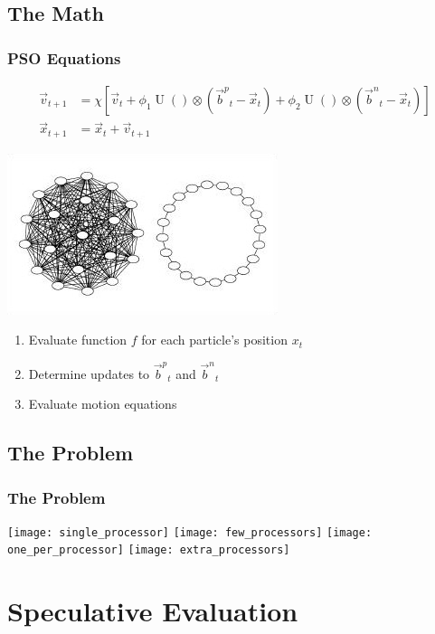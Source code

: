 \documentclass{beamer}
\DeclareMathOperator{\URand}{U}
\providecommand{\ppos}{\ensuremath{\Vec{x}}}
\providecommand{\pvel}{\ensuremath{\Vec{v}}}
\providecommand{\nbest}{\ensuremath{\Vec{b}^n}}
\providecommand{\pbest}{\ensuremath{\Vec{b}^p}}
\providecommand{\constriction}{\ensuremath{\chi}}
\providecommand{\coeff}{\ensuremath{\phi}}
\begin{document}
\subsection{The Math}
\begin{frame}
  \frametitle{PSO Equations}
  \begin{align*}
	  \pvel_{t+1} &=
		  \constriction \left[ \pvel_t +
			  \coeff_1\URand()\otimes(\pbest_t - \ppos_t) +
			  \coeff_2\URand()\otimes(\nbest_t - \ppos_t)
		  \right] \\
	  \ppos_{t+1} &= \ppos_t + \pvel_{t+1}
  \end{align*}

  \begin{center}
	\includegraphics[width=.45\textwidth]{gbest_and_lbest}
  \end{center}

  \pause

  \begin{enumerate}
	\item Evaluate function $f$ for each particle's position $x_t$
	\item Determine updates to $\pbest_t$ and $\nbest_t$
	\item Evaluate motion equations
  \end{enumerate}
\end{frame}

\subsection{The Problem}
\begin{frame}
  \frametitle{The Problem}
  \texttt{[image: single\_processor]}
  \texttt{[image: few\_processors]}
  \texttt{[image: one\_per\_processor]}
  \texttt{[image: extra\_processors]}
\end{frame}

\section{Speculative Evaluation}
\end{document}
